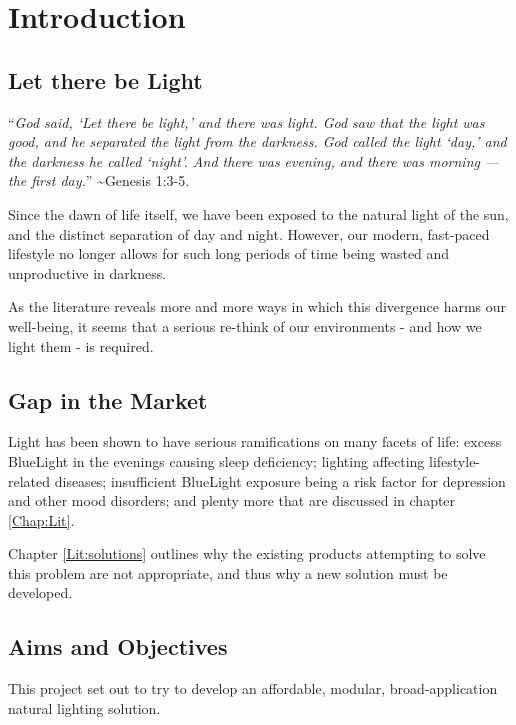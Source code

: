 
\chapter{Introduction}
\label{Chap:Intro}

\setcounter{section}{-1}

\section{Let there be Light}

``\textit{God said, `Let there be light,' and there was light. God saw that the light was good, and he separated the light from the darkness. God called the light `day,' and the darkness he called `night'. And there was evening, and there was morning — the first day.}'' \textasciitilde Genesis 1:3-5.

Since the dawn of life itself, we have been exposed to the natural light of the sun, and the distinct separation of day and night. However, our modern, fast-paced lifestyle no longer allows for such long periods of time being wasted and unproductive in darkness.

As the literature reveals more and more ways in which this divergence harms our well-being, it seems that a serious re-think of our environments - and how we light them - is required.

\section{Gap in the Market}

Light has been shown to have serious ramifications on many facets of life: excess \gls{BlueLight} in the evenings causing sleep deficiency; lighting affecting lifestyle-related diseases; insufficient \gls{BlueLight} exposure being a risk factor for depression and other mood disorders; and plenty more that are discussed in chapter \ref{Chap:Lit}.

Chapter \ref{Lit:solutions} outlines why the existing products attempting to solve this problem are not appropriate, and thus why a new solution must be developed. 

\section{Aims and Objectives}

This project set out to try to develop an affordable, modular, broad-application natural lighting solution. 


